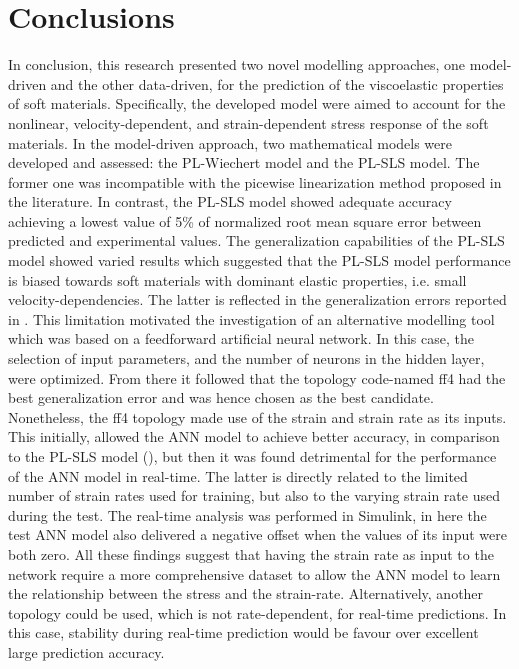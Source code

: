 \section{Conclusions}

In conclusion, this research presented two novel modelling approaches, one model-driven and the other data-driven, for the prediction of the viscoelastic properties of soft materials. Specifically, the developed model were aimed to account for the nonlinear, velocity-dependent, and strain-dependent stress response of the soft materials. In the model-driven approach, two mathematical models were developed and assessed: the PL-Wiechert model and the PL-SLS model. The former one was incompatible with the picewise linearization method proposed in the literature. In contrast, the PL-SLS model showed adequate accuracy achieving a lowest value of 5\% of normalized root mean square error between predicted and experimental values. The generalization capabilities of the PL-SLS model showed varied results which suggested that the PL-SLS model performance is biased towards soft materials with dominant elastic properties, i.e. small velocity-dependencies. The latter is reflected in the generalization errors reported in . This limitation motivated the investigation of an alternative modelling tool which was based on a feedforward artificial neural network. In this case, the selection of input parameters, and the number of neurons in the hidden layer, were optimized. From there it followed that the topology code-named ff4 had the best generalization error and was hence chosen as the best candidate. Nonetheless, the ff4 topology made use of the strain and strain rate as its inputs. This initially, allowed the ANN model to achieve better accuracy, in comparison to the PL-SLS model (), but then it was found detrimental for the performance of the ANN model in real-time. The latter is directly related to the limited number of strain rates used for training, but also to the varying strain rate used during the test. The real-time analysis was performed in Simulink, in here the test ANN model also delivered a negative offset when the values of its input were both zero. All these findings suggest that having the strain rate as input to the network require a more comprehensive dataset to allow the ANN model to learn the relationship between the stress and the strain-rate. Alternatively, another topology could be used, which is not rate-dependent, for real-time predictions. In this case, stability during real-time prediction would be favour over excellent large prediction accuracy.

